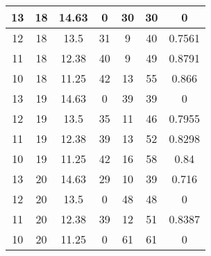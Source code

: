 \documentclass[letterpaper, 12pt]{article}
\begin{document}
\begin{longtable}{|c|c|c|c|c|c|c|}
\hline
13 & 18 & 14.63 & 0 & 30 & 30 & 0 \\
\hline
12 & 18 & 13.5 & 31 & 9 & 40 & 0.7561 \\
\hline
11 & 18 & 12.38 & 40 & 9 & 49 & 0.8791 \\
\hline
10 & 18 & 11.25 & 42 & 13 & 55 & 0.866 \\
\hline
13 & 19 & 14.63 & 0 & 39 & 39 & 0 \\
\hline
12 & 19 & 13.5 & 35 & 11 & 46 & 0.7955 \\
\hline
11 & 19 & 12.38 & 39 & 13 & 52 & 0.8298 \\
\hline
10 & 19 & 11.25 & 42 & 16 & 58 & 0.84 \\
\hline
13 & 20 & 14.63 & 29 & 10 & 39 & 0.716 \\
\hline
12 & 20 & 13.5 & 0 & 48 & 48 & 0 \\
\hline
11 & 20 & 12.38 & 39 & 12 & 51 & 0.8387 \\
\hline
10 & 20 & 11.25 & 0 & 61 & 61 & 0 \\
\hline
\end{longtable}
\end{document}
